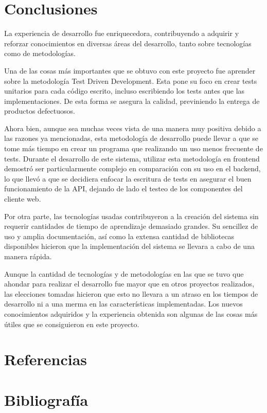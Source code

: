 \documentclass{article}
\begin{document}
\section{Conclusiones}
La experiencia de desarrollo fue enriquecedora, contribuyendo a adquirir y reforzar conocimientos en diversas áreas del desarrollo, tanto sobre tecnologías como de metodologías.

Una de las cosas más importantes que se obtuvo con este proyecto fue aprender sobre la metodología Test Driven Development. Esta pone su foco en crear tests unitarios para cada código escrito, incluso escribiendo los tests antes que las implementaciones. De esta forma se asegura la calidad, previniendo la entrega de productos defectuosos.

Ahora bien, aunque sea muchas veces vista de una manera muy positiva debido a las razones ya mencionadas, esta metodología de desarrollo puede llevar a que se tome más tiempo en crear un programa que realizando un uso menos frecuente de tests. Durante el desarrollo de este sistema, utilizar esta metodología en frontend demostró ser particularmente complejo en comparación con su uso en el backend, lo que llevó a que se decidiera enfocar la escritura de tests en asegurar el buen funcionamiento de la API, dejando de lado el testeo de los componentes del cliente web.

Por otra parte, las tecnologías usadas contribuyeron a la creación del sistema sin requerir cantidades de tiempo de aprendizaje demasiado grandes. Su sencillez de uso y amplia documentación, así como la extensa cantidad de bibliotecas disponibles hicieron que la implementación del sistema se llevara a cabo de una manera rápida.

Aunque la cantidad de tecnologías y de metodologías en las que se tuvo que ahondar para realizar el desarrollo fue mayor que en otros proyectos realizados, las elecciones tomadas hicieron que esto no llevara a un atraso en los tiempos de desarrollo ni a una merma en las características implementadas. Los nuevos conocimientos adquiridos y la experiencia obtenida son algunas de las cosas más útiles que se consiguieron en este proyecto.
\newpage
\section{Referencias}
\begin{sloppypar}
\printbibliography[heading=none,category=cited]
\end{sloppypar}
\newpage
\section{Bibliografía}
\printbibliography[heading=none,notcategory=cited]
\newpage
\end{document}
